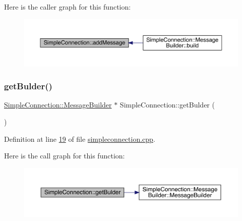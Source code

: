 Here is the caller graph for this function\+:
\nopagebreak
\begin{figure}[H]
\begin{center}
\leavevmode
\includegraphics[width=350pt]{dc/dfe/a00125_a0e40869759ba98f1964257d9c507b733_icgraph}
\end{center}
\end{figure}
\mbox{\label{a00125_a2bbd5504e2e67fa95a701f77cd438f4d}} 
\subsubsection{\texorpdfstring{get\+Bulder()}{getBulder()}}
{\footnotesize\ttfamily \hyperlink{a00129}{Simple\+Connection\+::\+Message\+Builder} $\ast$ Simple\+Connection\+::get\+Bulder (\begin{DoxyParamCaption}{ }\end{DoxyParamCaption})}



Definition at line \hyperlink{a00005_source_l00019}{19} of file \hyperlink{a00005_source}{simpleconnection.\+cpp}.

Here is the call graph for this function\+:
\nopagebreak
\begin{figure}[H]
\begin{center}
\leavevmode
\includegraphics[width=350pt]{dc/dfe/a00125_a2bbd5504e2e67fa95a701f77cd438f4d_cgraph}
\end{center}
\end{figure}
\mbox{\label{a00125_acd96d2282378dd8262c96604ede3715f}} 
